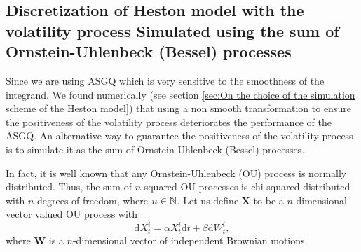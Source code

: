 \subsection{Discretization of Heston model with the volatility process Simulated using the sum of  Ornstein-Uhlenbeck (Bessel) processes}\label{sec:Discretization of Heston model with the volatility process Simulated using the sum of  Ornstein-Uhlenbeck (Bessel) processes}

Since we are using ASGQ which is very sensitive to the smoothness of the integrand. We found numerically (see section \ref{sec:On the choice of the simulation scheme of the Heston model}) that using a non smooth transformation to ensure the positiveness of the volatility process deteriorates the performance of the ASGQ. An alternative way to guarantee the positiveness of the volatility process is to simulate it as  the sum of  Ornstein-Uhlenbeck (Bessel) processes.

In fact, it is well known that any Ornstein-Uhlenbeck (OU) process is normally distributed. Thus, the sum of $n$ squared OU processes is chi-squared distributed with $n$ degrees of freedom, where $n \in \mathbb{N}$. Let us define $\mathbf{X}$ to be a $n$-dimensional vector valued OU process with
\begin{equation}\label{equivalent OU process} 
\mathrm{d}X_t^i = \alpha X_t^i \mathrm{d}t + \beta \mathrm{d}W_t^i,
\end{equation}
where $\mathbf{W}$ is a $n$-dimensional vector of independent Brownian motions. 

